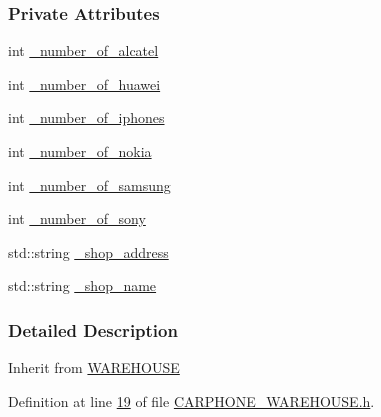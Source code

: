 \subsubsection*{Private Attributes}
\begin{DoxyCompactItemize}
\item 
int \hyperlink{class_c_a_r_p_h_o_n_e___w_a_r_e_h_o_u_s_e_a7e089af48a2a409a8d348d81f65d9193_a7e089af48a2a409a8d348d81f65d9193}{\+\_\+number\+\_\+of\+\_\+alcatel}
\item 
int \hyperlink{class_c_a_r_p_h_o_n_e___w_a_r_e_h_o_u_s_e_a4bf36b969e0873142ecac780d6f240bf_a4bf36b969e0873142ecac780d6f240bf}{\+\_\+number\+\_\+of\+\_\+huawei}
\item 
int \hyperlink{class_c_a_r_p_h_o_n_e___w_a_r_e_h_o_u_s_e_af8f016cde9df0070da24fb8804f3d6ca_af8f016cde9df0070da24fb8804f3d6ca}{\+\_\+number\+\_\+of\+\_\+iphones}
\item 
int \hyperlink{class_c_a_r_p_h_o_n_e___w_a_r_e_h_o_u_s_e_a05e0c6f134857e06bdf9e6ae71eb9b4e_a05e0c6f134857e06bdf9e6ae71eb9b4e}{\+\_\+number\+\_\+of\+\_\+nokia}
\item 
int \hyperlink{class_c_a_r_p_h_o_n_e___w_a_r_e_h_o_u_s_e_a6ee4003dc7303c7df17f67a26556bdf0_a6ee4003dc7303c7df17f67a26556bdf0}{\+\_\+number\+\_\+of\+\_\+samsung}
\item 
int \hyperlink{class_c_a_r_p_h_o_n_e___w_a_r_e_h_o_u_s_e_acf5bfebe1b5427a0b932f0cdc3b1ccdb_acf5bfebe1b5427a0b932f0cdc3b1ccdb}{\+\_\+number\+\_\+of\+\_\+sony}
\item 
std\+::string \hyperlink{class_c_a_r_p_h_o_n_e___w_a_r_e_h_o_u_s_e_a085b59da7d9f351043de6398b98898a7_a085b59da7d9f351043de6398b98898a7}{\+\_\+shop\+\_\+address}
\item 
std\+::string \hyperlink{class_c_a_r_p_h_o_n_e___w_a_r_e_h_o_u_s_e_a4ac330ca32a05ae4391a00db62ca6128_a4ac330ca32a05ae4391a00db62ca6128}{\+\_\+shop\+\_\+name}
\end{DoxyCompactItemize}


\subsubsection{Detailed Description}
Inherit from \hyperlink{class_w_a_r_e_h_o_u_s_e}{W\+A\+R\+E\+H\+O\+U\+SE} 

Definition at line \hyperlink{_c_a_r_p_h_o_n_e___w_a_r_e_h_o_u_s_e_8h_source_l00019}{19} of file \hyperlink{_c_a_r_p_h_o_n_e___w_a_r_e_h_o_u_s_e_8h_source}{C\+A\+R\+P\+H\+O\+N\+E\+\_\+\+W\+A\+R\+E\+H\+O\+U\+S\+E.\+h}.



